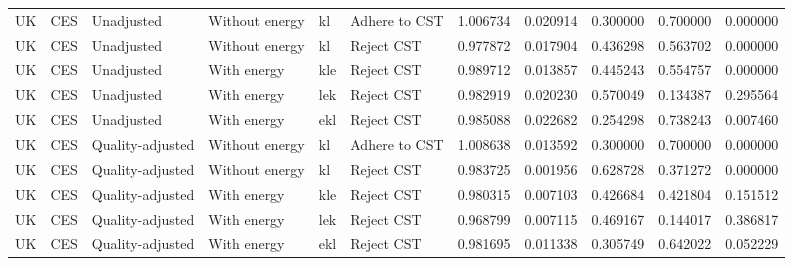 \documentclass[preprint,authoryear,12pt]{elsarticle}\usepackage[]{graphicx}\usepackage[]{color}
\begin{document}
\begin{table}[ht]
{\begin{tabular}{llllllrrrrr}
  UK & CES & Unadjusted & Without energy & kl & Adhere to CST & 1.006734 & 0.020914 & 0.300000 & 0.700000 & 0.000000 \\ 
  UK & CES & Unadjusted & Without energy & kl & Reject CST & 0.977872 & 0.017904 & 0.436298 & 0.563702 & 0.000000 \\ 
  UK & CES & Unadjusted & With energy & kle & Reject CST & 0.989712 & 0.013857 & 0.445243 & 0.554757 & 0.000000 \\ 
  UK & CES & Unadjusted & With energy & lek & Reject CST & 0.982919 & 0.020230 & 0.570049 & 0.134387 & 0.295564 \\ 
  UK & CES & Unadjusted & With energy & ekl & Reject CST & 0.985088 & 0.022682 & 0.254298 & 0.738243 & 0.007460 \\ 
  UK & CES & Quality-adjusted & Without energy & kl & Adhere to CST & 1.008638 & 0.013592 & 0.300000 & 0.700000 & 0.000000 \\ 
  UK & CES & Quality-adjusted & Without energy & kl & Reject CST & 0.983725 & 0.001956 & 0.628728 & 0.371272 & 0.000000 \\ 
  UK & CES & Quality-adjusted & With energy & kle & Reject CST & 0.980315 & 0.007103 & 0.426684 & 0.421804 & 0.151512 \\ 
  UK & CES & Quality-adjusted & With energy & lek & Reject CST & 0.968799 & 0.007115 & 0.469167 & 0.144017 & 0.386817 \\ 
  UK & CES & Quality-adjusted & With energy & ekl & Reject CST & 0.981695 & 0.011338 & 0.305749 & 0.642022 & 0.052229 \\ 
   \hline
\end{tabular}
}
\end{table}
\end{document}

